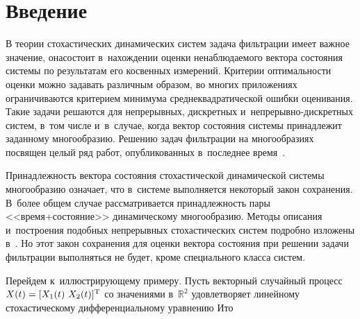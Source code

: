 \thispagestyle{headings}

\begin{multicols}{2}

\label{st\stat}

\section{Введение}

В теории стохастических динамических систем задача фильтрации 
имеет важное значение, она\linebreak состоит в~нахождении оценки 
ненаблюдаемого вектора состояния системы по результатам его косвенных измерений. 
Критерии оптимальности оценки можно задавать различным образом, во многих 
приложениях ограничиваются критерием минимума среднеквадратической ошибки оценивания. 
Такие задачи решаются для непрерывных, дискретных и~не\-пре\-рыв\-но-дис\-крет\-ных 
систем, в~том числе и~в~случае, когда вектор состояния системы принадлежит 
заданному многообразию. Решению задач фильтрации на многообразиях посвящен 
целый ряд работ, опубликованных в~последнее 
время~\cite{Sin_SSI16, Sin_IP16, SinSinKor_SSI16, SinSinKor_IP17, SinSinSerKor_AiT18}.

Принадлежность вектора состояния стохастической динамической системы 
многообразию означает, что в~системе выполняется некоторый закон сохранения. 
В~более общем случае рассматривается принадлежность пары <<вре\-мя\;+\;со\-сто\-яние>> 
динамическому многообразию. Методы описания и~построения подобных непрерывных 
стохастических систем подробно изложены в~\cite{Dub_89, Dub_12, Kar_14, Kar_15}. 
Но этот закон сохранения для оценки вектора состояния при решении 
задачи фильтрации выполняться не будет, кроме специального класса систем.

Перейдем к~иллюстрирующему примеру. 
Пусть векторный случайный процесс $X(t) \hm= [  X_1(t) ~ X_2(t)  ]^\trans$ 
со значениями в~$\mathds{R}^2$ удовлетворяет линейному стохастическому 
дифференциальному уравнению Ито


\end{multicols}
